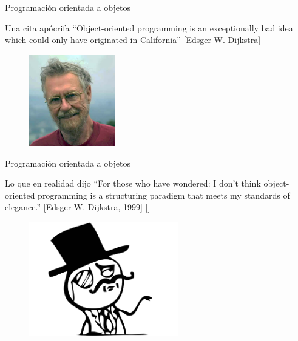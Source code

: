 
\begin{frame}{Programación orientada a objetos}
  \small
  \begin{block}
    {\centering Una cita apócrifa}
    \centering
    ``Object-oriented programming is an exceptionally bad
    idea which could only have originated in California''
    [Edsger W. Dijkstra]
  \end{block}

  \begin{figure}
    \centering
    \includegraphics[height=4cm]{pics/dijkstra.jpg}
  \end{figure}
\end{frame}

\begin{frame}{Programación orientada a objetos}
  \small
  \begin{block}
    {\centering Lo que en realidad dijo}
    \centering
    ``For those who have wondered: I don't think object-oriented
    programming is a structuring paradigm that meets my standards of
    elegance.'' [Edsger W. Dijkstra, 1999]
    [\href{http://www.cs.utexas.edu/users/EWD/transcriptions/EWD12xx/EWD1284.html}
      {}]
  \end{block}

  \begin{figure}
    \centering
    \includegraphics[height=5cm]{pics/like-a-sir.png}
  \end{figure}
\end{frame}

